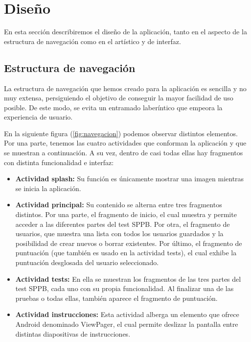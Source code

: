 \chapter{Diseño}

En esta sección describiremos el diseño de la aplicación, tanto en el aspecto de la estructura de navegación como en el artístico y de interfaz.

\section{Estructura de navegación}

La estructura de navegación que hemos creado para la aplicación es sencilla y no muy extensa, persiguiendo el objetivo de conseguir la mayor facilidad de uso posible. De este modo, se evita un entramado laberíntico que empeora la experiencia de usuario.

En la siguiente figura (\ref{fig:navegacion}) podemos observar distintos elementos. Por una parte, tenemos las cuatro actividades que conforman la aplicación y que se muestran a continuación. A su vez, dentro de casi todas ellas hay fragmentos con distinta funcionalidad e interfaz: 
\begin{itemize}
    \item \textbf{Actividad splash:} Su función es únicamente mostrar una imagen mientras se inicia la aplicación.
    
    \item \textbf{Actividad principal:} Su contenido se alterna entre tres fragmentos distintos. Por una parte, el fragmento de inicio, el cual muestra y permite acceder a las diferentes partes del test SPPB. Por otra, el fragmento de usuarios, que muestra una lista con todos los usuarios guardados y la posibilidad de crear nuevos o borrar existentes. Por último, el fragmento de puntuación (que también es usado en la actividad tests), el cual exhibe la puntuación desglosada del usuario seleccionado.
    
    \item \textbf{Actividad tests:} En ella se muestran los fragmentos de las tres partes del test SPPB, cada uno con su propia funcionalidad. Al finalizar una de las pruebas o todas ellas, también aparece el fragmento de puntuación.
    
    \item \textbf{Actividad instrucciones:} Esta actividad alberga un elemento que ofrece Android denominado ViewPager, el cual permite deslizar la pantalla entre distintas diapositivas de instrucciones.
\end{itemize}

